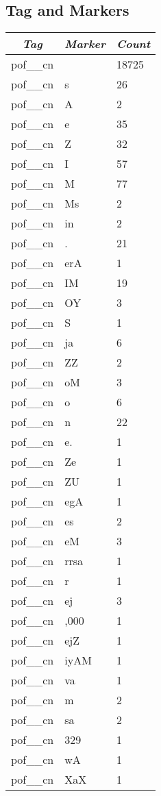 \documentclass[a4 paper]{article}
\begin{document}
\subsection{Tag and Markers}


\begin{longtable}{cp{}p{}}
    \toprule
    \textit{Tag} & \textit{Marker} & \textit{Count} \\ 
    \toprule
pof\_\_cn &  & 18725\\ \midrule pof\_\_cn & s & 26\\ \midrule pof\_\_cn & A & 2\\ \midrule pof\_\_cn & e & 35\\ \midrule pof\_\_cn & Z & 32\\ \midrule pof\_\_cn & I & 57\\ \midrule pof\_\_cn & M & 77\\ \midrule pof\_\_cn & Ms & 2\\ \midrule pof\_\_cn & in & 2\\ \midrule pof\_\_cn & . & 21\\ \midrule pof\_\_cn & erA & 1\\ \midrule pof\_\_cn & IM & 19\\ \midrule pof\_\_cn & OY & 3\\ \midrule pof\_\_cn & S & 1\\ \midrule pof\_\_cn & ja & 6\\ \midrule pof\_\_cn & ZZ & 2\\ \midrule pof\_\_cn & oM & 3\\ \midrule pof\_\_cn & o & 6\\ \midrule pof\_\_cn & n & 22\\ \midrule pof\_\_cn & e. & 1\\ \midrule pof\_\_cn & Ze & 1\\ \midrule pof\_\_cn & ZU & 1\\ \midrule pof\_\_cn & egA & 1\\ \midrule pof\_\_cn & es & 2\\ \midrule pof\_\_cn & eM & 3\\ \midrule pof\_\_cn & rrsa & 1\\ \midrule pof\_\_cn & r & 1\\ \midrule pof\_\_cn & ej & 3\\ \midrule pof\_\_cn & ,000 & 1\\ \midrule pof\_\_cn & ejZ & 1\\ \midrule pof\_\_cn & iyAM & 1\\ \midrule pof\_\_cn & va & 1\\ \midrule pof\_\_cn & m & 2\\ \midrule pof\_\_cn & sa & 2\\ \midrule pof\_\_cn & 329 & 1\\ \midrule pof\_\_cn & wA & 1\\ \midrule pof\_\_cn & XaX & 1\\ \midrule 

\end{longtable}
\end{document}
